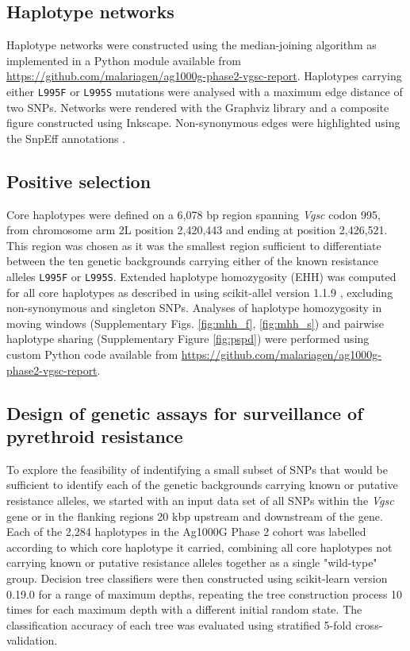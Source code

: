 \documentclass[a4paper,11pt,abstracton,hidelinks]{scrartcl}
\begin{document}
\subsection*{Haplotype networks}

%
Haplotype networks were constructed using the median-joining algorithm \cite{Bandelt1999} as implemented in a Python module available from \url{https://github.com/malariagen/ag1000g-phase2-vgsc-report}.
%
Haplotypes carrying either \texttt{L995F} or \texttt{L995S} mutations were analysed with a maximum edge distance of two SNPs.
%
Networks were rendered with the Graphviz library and a composite figure constructed using Inkscape.
%
Non-synonymous edges were highlighted using the SnpEff annotations \cite{Cingolani2012}.


\subsection*{Positive selection}

Core haplotypes were defined on a 6,078 bp region spanning \textit{Vgsc} codon 995, from chromosome arm 2L position 2,420,443 and ending at position 2,426,521.
%
This region was chosen as it was the smallest region sufficient to differentiate between the ten genetic backgrounds carrying either of the known resistance alleles \texttt{L995F} or \texttt{L995S}.
%
Extended haplotype homozygosity (EHH) was computed for all core haplotypes as described in \cite{Sabeti2002} using scikit-allel version 1.1.9 \cite{Miles2016}, excluding non-synonymous and singleton SNPs.
%
Analyses of haplotype homozygosity in moving windows (Supplementary Figs. \ref{fig:mhh_f}, \ref{fig:mhh_s}) and pairwise haplotype sharing (Supplementary Figure \ref{fig:pspd}) were performed using custom Python code available from \url{https://github.com/malariagen/ag1000g-phase2-vgsc-report}.
%

\subsection*{Design of genetic assays for surveillance of pyrethroid resistance}

To explore the feasibility of indentifying a small subset of SNPs that would be sufficient to identify each of the genetic backgrounds carrying known or putative resistance alleles, we started with an input data set of all SNPs within the \textit{Vgsc} gene or in the flanking regions 20 kbp upstream and downstream of the gene.
%
Each of the 2,284 haplotypes in the Ag1000G Phase 2 cohort was labelled according to which core haplotype it carried, combining all core haplotypes not carrying known or putative resistance alleles together as a single "wild-type" group.
%
Decision tree classifiers were then constructed using scikit-learn version 0.19.0 \cite{Pedregosa2011} for a range of maximum depths, repeating the tree construction process 10 times for each maximum depth with a different initial random state.
%
The classification accuracy of each tree was evaluated using stratified 5-fold cross-validation.
%
\end{document}
